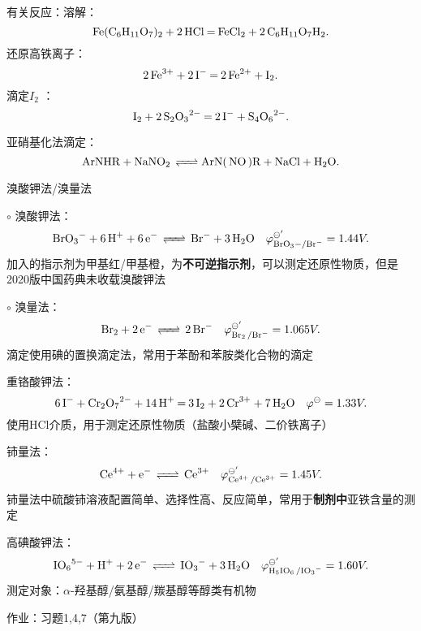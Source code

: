 \begin{notation}
    有关反应：溶解：\[
        \ce{Fe(C_6H_{11}O_7)_2 + 2HCl = FeCl_2 + 2C_6H_{11}O_7H_2} 
    .\]
    还原高铁离子：\[
        \ce{2Fe^{3+} + 2I^- = 2Fe^{2+} + I_2}
    .\]
    滴定$I_2$ ：\[
        \ce{I_2 + 2S_2O_3^{2-} = 2I^- + S_4O_6^{2-}}
    .\]
\end{notation}
\begin{notation}
    亚硝基化法滴定：\[
        \ce{ArNHR +NaNO_2 \ce{<=>[][]}ArN( NO )R +NaCl +H_2O}
    .\]
\end{notation}
\begin{notation}
    溴酸钾法/溴量法

    $\circ$ 溴酸钾法：\[
        \ce{BrO_3- +6H+ +6e- \ce{<=>[][]} Br- +3H_2O}\quad \varphi^{\ominus'} _{\ce{BrO_3-/Br-}} =1.44V
    .\]
    加入的指示剂为甲基红/甲基橙，为\textbf{不可逆指示剂}，可以测定还原性物质，但是2020版中国药典未收载溴酸钾法

    $\circ$ 溴量法：\[
        \ce{Br_2 +2e- \ce{<=>[][]} 2Br-}\quad \varphi^{\ominus'} _{\ce{Br_2 /Br-}}=1.065V
    .\]
    滴定使用碘的置换滴定法，常用于苯酚和苯胺类化合物的滴定
\end{notation}
\begin{notation}
重铬酸钾法：\[
    \ce{6I^- + Cr_2O_7^{2-} + 14H^+ = 3I_2 + 2Cr^{3+} + 7H_2O}\quad \varphi^\ominus=1.33V
    .\]
使用HCl介质，用于测定还原性物质（盐酸小檗碱、二价铁离子）
\end{notation}
\begin{notation}
铈量法：\[
    \ce{Ce^4+ +e- \ce{<=>[][]} Ce^3+}\quad \varphi^{\ominus'} _{\ce{Ce^4+ /Ce^3+}} =1.45V
.\]
铈量法中硫酸铈溶液配置简单、选择性高、反应简单，常用于\textbf{制剂中}亚铁含量的测定
\end{notation}
\begin{notation}
    高碘酸钾法：\[
        \ce{IO_6^5- +H+ +2e- \ce{<=>[][]} IO_3- +3H_2O}\quad \varphi^{\ominus'} _{\ce{H_5IO_6 /IO_3-}} = 1.60V
    .\]
    测定对象：$\alpha$-羟基醇/氨基醇/羰基醇等醇类有机物
\end{notation}
作业：习题1,4,7（第九版）
